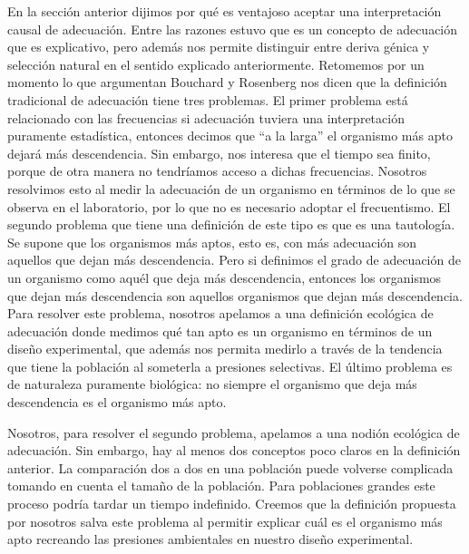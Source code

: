  En la sección anterior dijimos por qué es ventajoso aceptar una interpretación causal de adecuación. Entre las razones estuvo que es un concepto de adecuación que es explicativo, pero además nos permite distinguir entre deriva génica y selección natural en el sentido explicado anteriormente. Retomemos por un momento lo que argumentan Bouchard y Rosenberg \citeyear{Bouchard2004} nos dicen que la definición tradicional de adecuación tiene tres problemas. El primer problema está relacionado con las frecuencias si adecuación tuviera una interpretación puramente estadística, entonces decimos que ``a la larga'' el organismo más apto dejará más descendencia. Sin embargo, nos interesa que el tiempo sea finito, porque de otra manera no tendríamos acceso a dichas frecuencias. Nosotros resolvimos esto al medir la adecuación de un organismo en términos de lo que se observa en el laboratorio, por lo que no es necesario adoptar el frecuentismo. El segundo problema que tiene una definición de este tipo es que es una tautología. Se supone que los organismos más aptos, esto es, con más adecuación son aquellos que dejan más descendencia. Pero si definimos el grado de adecuación de un organismo como aquél que deja más descendencia, entonces los organismos que dejan más descendencia son aquellos organismos que dejan más descendencia. Para resolver este problema, nosotros apelamos a una definición ecológica de adecuación donde medimos qué tan apto es un organismo en términos de un diseño experimental, que además nos permita medirlo a través de la tendencia que tiene la población al someterla a presiones selectivas. El último problema es de naturaleza puramente biológica: no siempre el organismo que deja más descendencia es el organismo más apto.

 Nosotros, para resolver el segundo problema, apelamos a una nodión ecológica de adecuación. Sin embargo, hay al menos dos conceptos poco claros en la definición anterior. La comparación dos a dos en una población puede volverse complicada tomando en cuenta el tamaño de la población. Para poblaciones grandes este proceso podría tardar un tiempo indefinido. Creemos que la definición propuesta por nosotros salva este problema al permitir explicar cuál es el organismo más apto recreando las presiones ambientales en nuestro diseño experimental.

